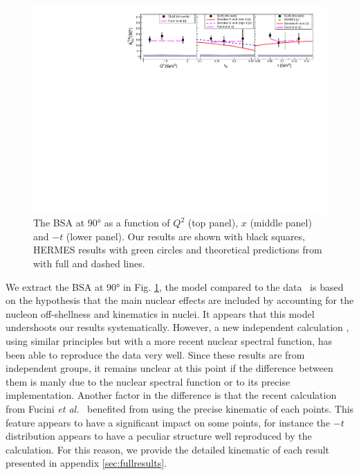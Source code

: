 \documentclass[aps,prc,preprint,superscriptaddress]{revtex4}
\begin{document}
\begin{figure}[tbp]
\center
\includegraphics[width=15cm]{fig3/Coherent_ALU_phi_90.pdf}
\caption{The BSA at 90° as a function of $Q^2$ (top panel), $x$ (middle panel) and $-t$ (lower panel).
	Our results are shown with black squares, HERMES results 
	with green circles \cite{Airapetian:2009cga} and theoretical predictions 
	from \cite{Liuti:2005gi} with full and dashed lines.}
\label{fig:CohALU90}
\end{figure}

We extract the BSA at 90° in Fig. \ref{fig:CohALU90}, the model compared to the 
data~\cite{Liuti:2005gi} is based on the hypothesis that the main nuclear effects are 
included by accounting for the nucleon off-shellness and kinematics in nuclei. It 
appears that this model undershoots our results systematically. However, a new independent 
calculation \cite{Fucini:2018gso}, using similar principles but with a more recent nuclear spectral 
function, has been able to reproduce the data very well. Since these results are from independent 
groups, it remains unclear at this point if the difference between them is manly due to the nuclear
spectral function or to its precise implementation. Another factor in the difference is that the
recent calculation from Fucini {\it et al.}~\cite{Fucini:2018gso} benefited from using the precise 
kinematic of each points. This feature appears to have a significant impact on some points, for 
instance the $-t$ distribution appears to have a peculiar structure well reproduced by the 
calculation. For this reason, we provide the detailed kinematic of each result presented in
appendix \ref{sec:fullresults}.
\end{document}

